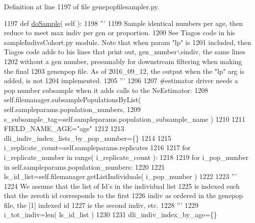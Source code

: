 Definition at line 1197 of file genepopfilesampler.\+py.


\begin{DoxyCode}
1197     \textcolor{keyword}{def }\hyperlink{classnegui_1_1genepopfilesampler_1_1GenepopFileSamplerIndividualsAgeStructureCohorts_a50e96ddae763e7e8dba2ac37fa0c6ce5}{doSample}( self ):
1198         \textcolor{stringliteral}{'''}
1199 \textcolor{stringliteral}{        Sample identical numbers per age, then reduce to meet max indiv per gen or proportion.  }
1200 \textcolor{stringliteral}{        See Tiagos code in his sampleIndivsCohort.py module.  Note that when param "lp" is }
1201 \textcolor{stringliteral}{        included, then Tiagos code adds to his lines that print out, gen\_number\(\backslash\)sindiv, the same lines}
1202 \textcolor{stringliteral}{        without a gen number, presumably for downstream filtering when making the final}
1203 \textcolor{stringliteral}{        genenpop file. As of 2016\_09\_12, the output when the "lp" arg is added, is not }
1204 \textcolor{stringliteral}{        implemented.}
1205 \textcolor{stringliteral}{        '''}
1206 
1207         \textcolor{comment}{#estimator driver needs a pop number subsample when it adds calls to the NeEstimator:}
1208         self.filemanager.subsamplePopulationsByList( self.sampleparams.population\_numbers,
1209                                         s\_subsample\_tag=self.sampleparams.population\_subsample\_name )
1210 
1211         FIELD\_NAME\_AGE=\textcolor{stringliteral}{"age"}
1212 
1213         dli\_indiv\_index\_lists\_by\_pop\_number=\{\}
1214         
1215         i\_replicate\_count=self.sampleparams.replicates
1216 
1217         \textcolor{keywordflow}{for} i\_replicate\_number \textcolor{keywordflow}{in} range( i\_replicate\_count ):
1218 
1219             \textcolor{keywordflow}{for} i\_pop\_number \textcolor{keywordflow}{in} self.sampleparams.population\_numbers:
1220 
1221                 ls\_id\_list=self.filemanager.getListIndividuals( i\_pop\_number )
1222 
1223                 \textcolor{stringliteral}{'''}
1224 \textcolor{stringliteral}{                We assume that the list of Id's in the individual list}
1225 \textcolor{stringliteral}{                is indexed such that the zeroth id corresponds to the first}
1226 \textcolor{stringliteral}{                indiv as ordered in the genepop file, the [1] indexed id}
1227 \textcolor{stringliteral}{                is the second indiv, etc.}
1228 \textcolor{stringliteral}{                '''}
1229                 i\_tot\_indiv=len( ls\_id\_list )
1230 
1231                 dli\_indiv\_index\_by\_age=\{\}

\end{DoxyCode}
